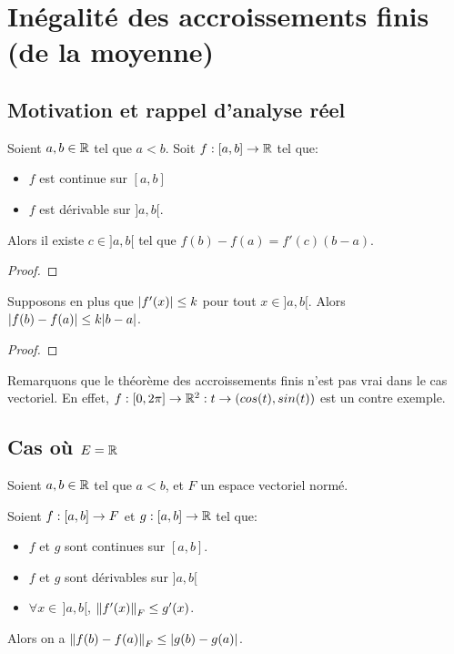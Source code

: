 \chapter{Inégalité des accroissements finis (de la moyenne)}

\section*{Motivation et rappel d'analyse réel}

\begin{theorem} 
	\label{theorem:mean_value_theorem_real_rappel}
	Soient $a, b \in \mathbb{R}$ tel que $a < b$.
	Soit $f : [a, b] \rightarrow \mathbb{R}$ tel que:

	\begin{itemize}
		\item $f$ est continue sur $[a, b]$
		\item $f$ est dérivable sur $]a, b[$.
	\end{itemize}

	Alors il existe $c \in ]a, b[$ tel que $f(b) - f(a) = f'(c) (b - a)$.
\end{theorem}

\ifdefined\outputproof
\begin{proof}

\end{proof}
\fi

\begin{proposition}
	Supposons en plus que $\abs{f'(x)} \leq k$ pour tout $x \in ]a, b[$.
	Alors $\abs{f(b) - f(a)} \leq k \abs{b - a}$.
\end{proposition}

\ifdefined\outputproof
\begin{proof}

\end{proof}
\fi

Remarquons que le théorème des accroissements finis n'est pas vrai dans le cas
vectoriel. En effet, $f : [0, 2\pi] \rightarrow \mathbb{R}^{2} : t \rightarrow
(cos(t), sin(t))$ est un contre exemple.

\section{Cas où $E = \mathbb{R}$}

\begin{theorem}
	Soient $a, b \in \mathbb{R}$ tel que $a < b$, et $F$ un espace vectoriel normé.

	Soient $f : [a, b] \rightarrow F$ et $g : [a, b] \rightarrow \mathbb{R}$ tel
	que:

	\begin{itemize}
		\item $f$ et $g$ sont continues sur $[a, b]$.
		\item $f$ et $g$ sont dérivables sur $]a, b[$
		\item $\forall x \in \, ]a, b[$, $\norm{f'(x)}_{F} \leq g'(x)$.
	\end{itemize}

	Alors on a $\norm{f(b) - f(a)}_{F} \leq \abs{g(b) - g(a)}$.
\end{theorem}

